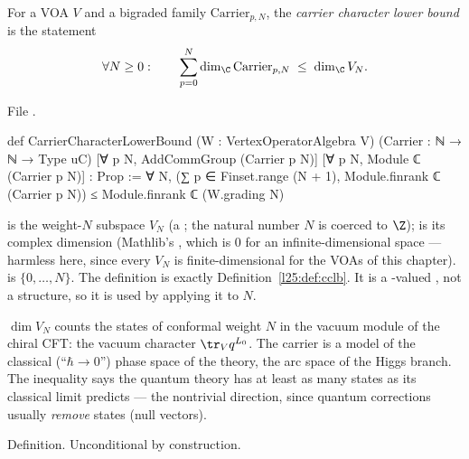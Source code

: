 \begin{definition}\label{l25:def:cclb}
For a VOA $V$ and a bigraded family $\mathrm{Carrier}_{p,N}$, the \emph{carrier character lower bound} is the
statement
\begin{equation*}
\forall N\ge0:\qquad \sum_{p=0}^{N}\dim_\C\mathrm{Carrier}_{p,N}\;\le\;\dim_\C V_N .
\end{equation*}
\end{definition}
\noindent File .
\begin{leancode}
def CarrierCharacterLowerBound (W : VertexOperatorAlgebra V)
    (Carrier : ℕ → ℕ → Type uC)
    [∀ p N, AddCommGroup (Carrier p N)]
    [∀ p N, Module ℂ (Carrier p N)] : Prop :=
  ∀ N,
    (∑ p ∈ Finset.range (N + 1), Module.finrank ℂ (Carrier p N)) ≤
      Module.finrank ℂ (W.grading N)
\end{leancode}
\begin{dictionary}
 is the weight-$N$ subspace $V_N$ (a ; the natural number $N$ is coerced to
$\Z$);  is its complex dimension (Mathlib's , which is $0$ for an
infinite-dimensional space --- harmless here, since every $V_N$ is finite-dimensional for the VOAs of this
chapter).  is $\{0,\dots,N\}$. The definition is exactly
Definition~\ref{l25:def:cclb}. It is a -valued , not a structure, so it is used by
applying it to $N$.
\end{dictionary}
\begin{physics}
$\dim V_N$ counts the states of conformal weight $N$ in the vacuum module of the chiral CFT: the vacuum
character $\tr_V q^{L_0}$. The carrier is a model of the classical (``$\hbar\to0$'') phase space of the
theory, the arc space of the Higgs branch. The inequality says the quantum theory has at least as many
states as its classical limit predicts --- the nontrivial direction, since quantum corrections usually
\emph{remove} states (null vectors).
\end{physics}
\begin{status}
Definition. Unconditional by construction.
\end{status}

